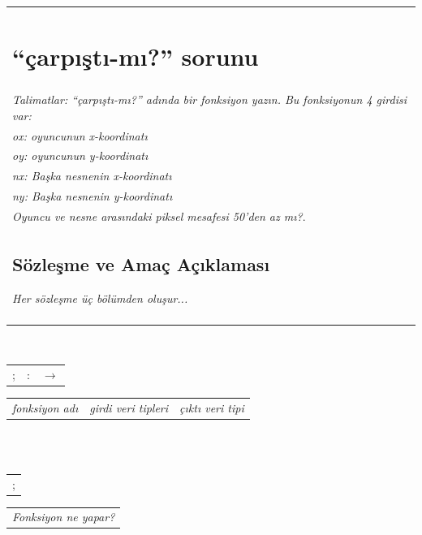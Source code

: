 \documentclass[12pt, a4paper]{article}
\begin{document}


\newpage
\noindent \begin{tabular}{p{16cm}}
\section*{“çarpıştı-mı?” sorunu}
\\
\textit{Talimatlar: “çarpıştı-mı?” adında bir fonksiyon yazın. Bu fonksiyonun 4 girdisi var: }\\

\textit{ox: oyuncunun x-koordinatı}\\  
\textit{oy: oyuncunun y-koordinatı }\\
\textit{nx: Başka nesnenin x-koordinatı}\\ 
\textit{ny: Başka nesnenin y-koordinatı }\\

\textit{Oyuncu ve nesne arasındaki piksel mesafesi 50’den az mı?}.
\\
\subsection*{Sözleşme ve Amaç Açıklaması}
\textit{Her sözleşme üç bölümden oluşur...}\\[10ex]
\\
\end{tabular}\\
\noindent \begin{tabular}{L{4cm} L{6cm} L{6cm}}
;\dotfill &:\dotfill &$\rightarrow$\dotfill \\
\end{tabular}
\noindent \begin{tabular}{C{4cm} C{6cm} C{6cm}}
\textit{fonksiyon adı} & \textit{girdi veri tipleri} & \textit{çıktı veri tipi} \\
\end{tabular}\\
\\
\noindent \begin{tabular}{L{17cm}}
{;\dotfill}\\
\end{tabular}
\noindent \begin{tabular}{C{17cm}}
{\textit{Fonksiyon ne yapar?}}\\
\end{tabular}
\end{document}

